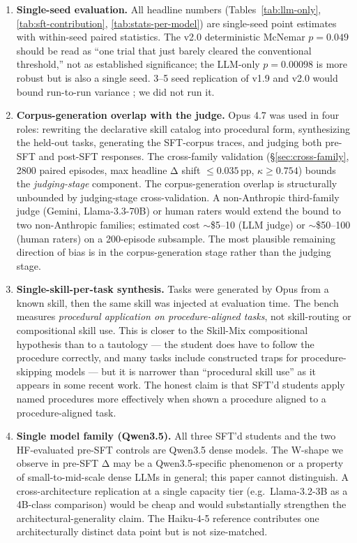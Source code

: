 \documentclass[10pt]{article}
\begin{document}
\begin{enumerate}[leftmargin=*]
  \item \textbf{Single-seed evaluation.} All headline numbers (Tables~\ref{tab:llm-only}, \ref{tab:sft-contribution}, \ref{tab:stats-per-model}) are single-seed point estimates with within-seed paired statistics. The v2.0 deterministic McNemar $p{=}0.049$ should be read as ``one trial that just barely cleared the conventional threshold,'' not as established significance; the LLM-only $p{=}0.00098$ is more robust but is also a single seed. 3--5 seed replication of v1.9 and v2.0 would bound run-to-run variance \citep{biderman2024lessons}; we did not run it.

  \item \textbf{Corpus-generation overlap with the judge.} Opus 4.7 was used in four roles: rewriting the declarative skill catalog into procedural form, synthesizing the held-out tasks, generating the SFT-corpus traces, and judging both pre-SFT and post-SFT responses. The cross-family validation (\S\ref{sec:cross-family}, 2800 paired episodes, max headline Δ shift $\leq 0.035$\,pp, $\kappa \geq 0.754$) bounds the \emph{judging-stage} component. The corpus-generation overlap is structurally unbounded by judging-stage cross-validation. A non-Anthropic third-family judge (Gemini, Llama-3.3-70B) or human raters would extend the bound to two non-Anthropic families; estimated cost $\sim$\$5--10 (LLM judge) or $\sim$\$50--100 (human raters) on a 200-episode subsample. The most plausible remaining direction of bias is in the corpus-generation stage rather than the judging stage.

  \item \textbf{Single-skill-per-task synthesis.} Tasks were generated by Opus from a known skill, then the same skill was injected at evaluation time. The bench measures \emph{procedural application on procedure-aligned tasks}, not skill-routing or compositional skill use. This is closer to the Skill-Mix compositional hypothesis \citep{yu2024skillmix} than to a tautology --- the student does have to follow the procedure correctly, and many tasks include constructed traps for procedure-skipping models --- but it is narrower than ``procedural skill use'' as it appears in some recent work. The honest claim is that SFT'd students apply named procedures more effectively when shown a procedure aligned to a procedure-aligned task.

  \item \textbf{Single model family (Qwen3.5).} All three SFT'd students and the two HF-evaluated pre-SFT controls are Qwen3.5 dense models. The W-shape we observe in pre-SFT Δ may be a Qwen3.5-specific phenomenon or a property of small-to-mid-scale dense LLMs in general; this paper cannot distinguish. A cross-architecture replication at a single capacity tier (e.g.\ Llama-3.2-3B as a 4B-class comparison) would be cheap and would substantially strengthen the architectural-generality claim. The Haiku-4-5 reference contributes one architecturally distinct data point but is not size-matched.


\end{enumerate}
\end{document}
